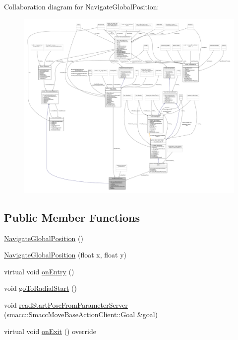 Collaboration diagram for Navigate\+Global\+Position\+:
\nopagebreak
\begin{figure}[H]
\begin{center}
\leavevmode
\includegraphics[width=350pt]{classNavigateGlobalPosition__coll__graph}
\end{center}
\end{figure}
\subsection*{Public Member Functions}
\begin{DoxyCompactItemize}
\item 
\hyperlink{classNavigateGlobalPosition_a9d689608937eb75fe747be14acfab57d}{Navigate\+Global\+Position} ()
\item 
\hyperlink{classNavigateGlobalPosition_a60ea1910d8d317fa0af83554aee56dde}{Navigate\+Global\+Position} (float x, float y)
\item 
virtual void \hyperlink{classNavigateGlobalPosition_a80962ce5bba51285565e360872f58c47}{on\+Entry} ()
\item 
void \hyperlink{classNavigateGlobalPosition_a5181e70601da336334f25a95840fd878}{go\+To\+Radial\+Start} ()
\item 
void \hyperlink{classNavigateGlobalPosition_a7f59ee188413d4f4b006549ba6d3d3f8}{read\+Start\+Pose\+From\+Parameter\+Server} (smacc\+::\+Smacc\+Move\+Base\+Action\+Client\+::\+Goal \&goal)
\item 
virtual void \hyperlink{classNavigateGlobalPosition_afbf7d81439a8d13ed7ac5a22194be28c}{on\+Exit} () override
\end{DoxyCompactItemize}
